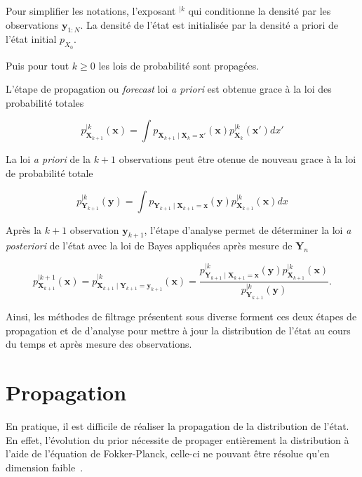Pour simplifier les notations, l'exposant $^{\mid k}$ qui conditionne la densité par les observations $\bm y_{1:N}$.
La densité de l'état est initialisée par la densité a priori de l'état initial $p_{X_0}$.

Puis pour tout $k \geq 0$ les lois de probabilité sont propagées.

L'étape de propagation ou \textit{forecast} loi \textit{a priori} est obtenue grace à la loi des probabilité totales

\begin{equation}\label{tot_rule}
    p_{\bm X_{k+1}}^{\mid k}(\bm x)= \int p_{\bm X_{k+1}\mid \bm X_{k} = \bm x'}(\bm x) p_{\bm X_{k}}^{\mid k}(\bm x')dx'
\end{equation}

La loi \textit{a priori} de la $k+1$ observations peut être otenue de nouveau grace à la loi de probabilité totale

\begin{equation*}
    p_{\bm Y_{k+1}}^{\mid k}(\bm y) = \int p_{\bm Y_{k+1}\mid \bm X_{k+1} = \bm x}(\bm y) p_{\bm X_{k+1}}^{\mid k}(\bm x)dx
\end{equation*}

Après la $k+1$ observation $\bm y_{k+1}$, l'étape d'analyse permet de déterminer la loi \textit{a posteriori} de l'état
avec la loi de Bayes appliquées après mesure de $\bm Y_n$

\begin{equation*}
    p_{\bm X_{k+1}}^{\mid k+1}(\bm x) = p_{\bm X_{k+1} \mid \bm Y_{k+1} = \bm y_{k+1}}^{\mid k}(\bm x) = \frac{p_{\bm Y_{k+1} \mid \bm X_{k+1} = \bm x}^{\mid k}(\bm y) p_{\bm X_{k+1}}^{\mid k}(\bm x) }{p_{\bm Y_{k+1}}^{\mid k}(\bm y)}.
\end{equation*}

Ainsi, les méthodes de filtrage présentent sous diverse forment ces deux étapes de propagation et de d'analyse pour mettre à jour la distribution de l'état au cours du temps et après mesure des observations.
\section{Propagation}

En pratique, il est difficile de réaliser la propagation de la distribution de l'état.
En effet, l'évolution du prior nécessite de propager entièrement la distribution à l'aide de l'équation de Fokker-Planck, celle-ci ne pouvant être résolue qu'en dimension faible~\cite{jazwinski_4_1970}.

